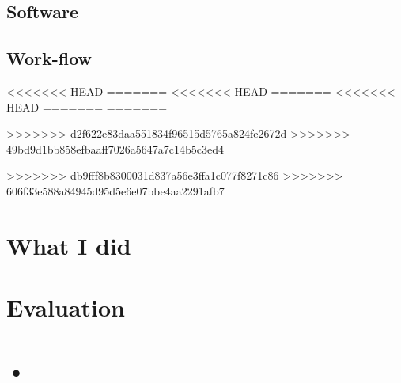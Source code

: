 \documentclass[11pt,a4paper]{report}
\begin{document}
\subsection{Software}

\subsection{Work-flow}
<<<<<<< HEAD
=======
<<<<<<< HEAD
=======
<<<<<<< HEAD
=======
=======

>>>>>>> d2f622e83daa551834f96515d5765a824fe2672d
>>>>>>> 49bd9d1bb858efbaaff7026a5647a7c14b5c3ed4

>>>>>>> db9fff8b8300031d837a56e3ffa1c077f8271c86
>>>>>>> 606f33e588a84945d95d5e6e07bbe4aa2291afb7

\section{What I did}



\section{Evaluation}



\section{•}
\end{document}
